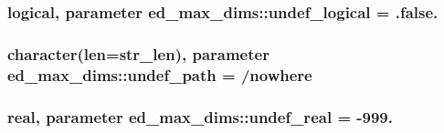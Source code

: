 \subsubsection[{\texorpdfstring{undef\+\_\+logical}{undef_logical}}]{\setlength{\rightskip}{0pt plus 5cm}logical, parameter ed\+\_\+max\+\_\+dims\+::undef\+\_\+logical = .false.}\hypertarget{namespaceed__max__dims_afc1309671c882a76723979195b5fc607}{}\label{namespaceed__max__dims_afc1309671c882a76723979195b5fc607}
\subsubsection[{\texorpdfstring{undef\+\_\+path}{undef_path}}]{\setlength{\rightskip}{0pt plus 5cm}character(len={\bf str\+\_\+len}), parameter ed\+\_\+max\+\_\+dims\+::undef\+\_\+path = \textquotesingle{}/nowhere\textquotesingle{}}\hypertarget{namespaceed__max__dims_ab42483146ea3e3c0eba8d1de6e746691}{}\label{namespaceed__max__dims_ab42483146ea3e3c0eba8d1de6e746691}
\subsubsection[{\texorpdfstring{undef\+\_\+real}{undef_real}}]{\setlength{\rightskip}{0pt plus 5cm}real, parameter ed\+\_\+max\+\_\+dims\+::undef\+\_\+real = -\/999.}\hypertarget{namespaceed__max__dims_aef3aefdf7aea5b758051bfc525dc719d}{}\label{namespaceed__max__dims_aef3aefdf7aea5b758051bfc525dc719d}
